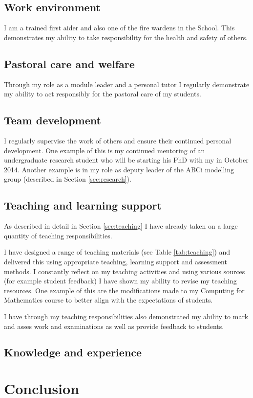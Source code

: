 \documentclass{article}
\begin{document}
\subsection{Work environment}

I am a trained first aider and also one of the fire wardens in the School.
This demonstrates my ability to take responsibility for the health and safety of others.

\subsection{Pastoral care and welfare}

Through my role as a module leader and a personal tutor I regularly demonstrate my ability to act responsibly for the pastoral care of my students.

\subsection{Team development}

I regularly supervise the work of others and ensure their continued personal development.
One example of this is my continued mentoring of an undergraduate research student who will be starting his PhD with my in October 2014.
Another example is in my role as deputy leader of the ABCi modelling group (described in Section \ref{sec:research}).

\subsection{Teaching and learning support}

As described in detail in Section \ref{sec:teaching} I have already taken on a large quantity of teaching responsibilities.

I have designed a range of teaching materials (see Table \ref{tab:teaching}) and delivered this using appropriate teaching, learning support and assessment methods.
I constantly reflect on my teaching activities and using various sources (for example student feedback) I have shown my ability to revise my teaching resources.
One example of this are the modifications made to my Computing for Mathematics course to better align with the expectations of students.

I have through my teaching responsibilities also demonstrated my ability to mark and asses work and examinations as well as provide feedback to students.

\subsection{Knowledge and experience}

\section{Conclusion}\label{sec:conclusion}

\newpage


\end{document}
